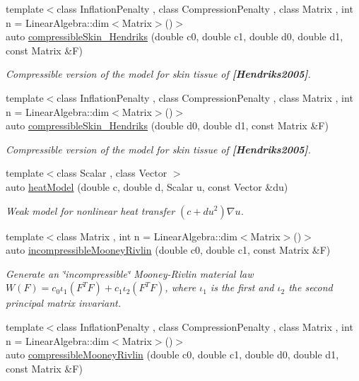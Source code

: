 \begin{DoxyCompactItemize}
{\footnotesize template$<$class Inflation\+Penalty , class Compression\+Penalty , class Matrix , int n = Linear\+Algebra\+::dim$<$\+Matrix$>$()$>$ }\\auto \hyperlink{group__Biomechanics_ga07b4c52c6ecf7e72f73ab5832fb262cd}{compressible\+Skin\+\_\+\+Hendriks} (double c0, double c1, double d0, double d1, const Matrix \&F)
\begin{DoxyCompactList}\small\item\em Compressible version of the model for skin tissue of {\bfseries [Hendriks2005]}. \end{DoxyCompactList}\item 
{\footnotesize template$<$class Inflation\+Penalty , class Compression\+Penalty , class Matrix , int n = Linear\+Algebra\+::dim$<$\+Matrix$>$()$>$ }\\auto \hyperlink{group__Biomechanics_ga42721e772b7eada1b0bca98247ad440f}{compressible\+Skin\+\_\+\+Hendriks} (double d0, double d1, const Matrix \&F)
\begin{DoxyCompactList}\small\item\em Compressible version of the model for skin tissue of {\bfseries [Hendriks2005]}. \end{DoxyCompactList}\item 
{\footnotesize template$<$class Scalar , class Vector $>$ }\\auto \hyperlink{namespaceFunG_aab17a1468e61f58564333b3fcd7900d6}{heat\+Model} (double c, double d, Scalar u, const Vector \&du)
\begin{DoxyCompactList}\small\item\em Weak model for nonlinear heat transfer $ (c+du^2)\nabla u $. \end{DoxyCompactList}\item 
{\footnotesize template$<$class Matrix , int n = Linear\+Algebra\+::dim$<$\+Matrix$>$()$>$ }\\auto \hyperlink{group__Rubber_gace19173e33490aadd36ae3a03fd1d85c}{incompressible\+Mooney\+Rivlin} (double c0, double c1, const Matrix \&F)
\begin{DoxyCompactList}\small\item\em Generate an \char`\"{}incompressible\char`\"{} Mooney-\/\+Rivlin material law $ W(F)=c_0\iota_1(F^T F) + c_1\iota_2(F^T F) $, where $\iota_1$ is the first and $\iota_2$ the second principal matrix invariant. \end{DoxyCompactList}\item 
{\footnotesize template$<$class Inflation\+Penalty , class Compression\+Penalty , class Matrix , int n = Linear\+Algebra\+::dim$<$\+Matrix$>$()$>$ }\\auto \hyperlink{group__Rubber_ga9a1894daa10a0bdcc620c6c41ecb6f19}{compressible\+Mooney\+Rivlin} (double c0, double c1, double d0, double d1, const Matrix \&F)

\end{DoxyCompactItemize}
